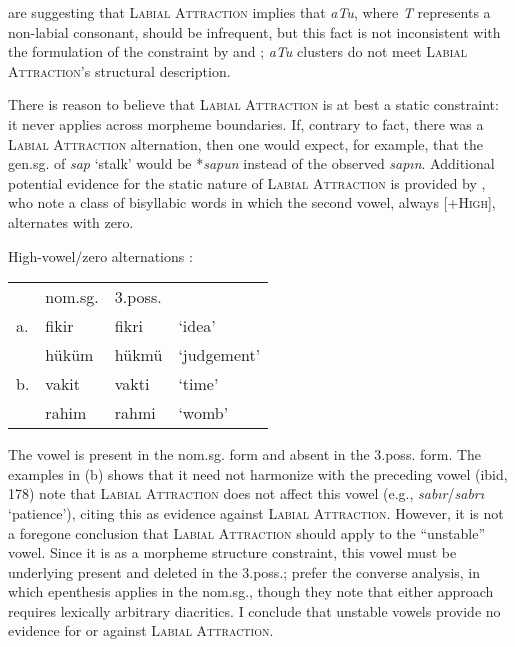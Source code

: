 \noindent
\citeauthor{Clements1982} are suggesting that \textsc{Labial Attraction} implies that \emph{aTu}, where \emph{T} represents a non-labial consonant, should be infrequent, but this fact is not inconsistent with the formulation of the constraint by \citet{Lees1966a,Lees1996b} and \citet{Zimmer1969}; \emph{aTu} clusters do not meet \textsc{Labial Attraction}'s structural description.

There is reason to believe that \textsc{Labial Attraction} is at best a static constraint: it never applies across morpheme boundaries. If, contrary to fact, there was a \textsc{Labial Attraction} alternation, then one would expect, for example, that the gen.sg. of \emph{sap} `stalk' would be *\emph{sapun} instead of the observed \emph{sapın}. Additional potential evidence for the static nature of \textsc{Labial Attraction} is provided by \citeauthor{Clements1982}, who note a class of bisyllabic words in which the second vowel, always [$+$\textsc{High}], alternates with zero. 

\ex High-vowel/zero alternations \citep[][243]{Clements1982}: \\
\begin{tabular}{l l l l}
   & nom.sg. & 3.poss. \\
a. & fikir   & fikri & `idea' \\ 
   & hüküm   & hükmü & `judgement' \\ 
b. & vakit  & vakti  & `time' \\
   & rahim  & rahmi  & `womb' \\
\end{tabular}
\xe

\noindent 
The vowel is present in the nom.sg. form and absent in the 3.poss. form. The examples in (\lastx b) shows that it need not harmonize with the preceding vowel
\citeauthor{Inkelas2001} (ibid, 178) note that \textsc{Labial Attraction} does not affect this vowel (e.g., \emph{sabır}/\emph{sabrı} `patience'), citing this as evidence against \textsc{Labial Attraction}. However, it is not a foregone conclusion that \textsc{Labial Attraction} should apply to the ``unstable'' vowel. Since it is as a morpheme structure constraint, this vowel must be underlying present and deleted in the 3.poss.; \citeauthor{Clements1982} prefer the converse analysis, in which epenthesis applies in the nom.sg., though they note that either approach requires lexically arbitrary diacritics. I conclude that unstable vowels provide no evidence for or against \textsc{Labial Attraction}.

